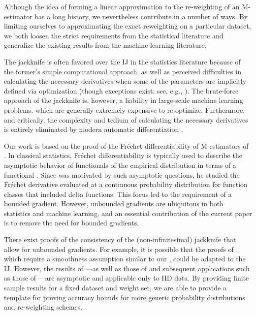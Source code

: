 Although the idea of forming a linear approximation to the re-weighting of an
M-estimator has a long history, we nevertheless contribute in a number of ways.
By limiting ourselves to approximating the exact reweighting on a particular
dataset, we both loosen the strict requirements from the statistical literature
and generalize the existing results from the machine learning literature.

The jackknife is often favored over the IJ in the
statistics literature because of the former's simple computational approach, as
well as perceived difficulties in calculating the necessary derivatives when
some of the parameters are implicitly defined via optimization
\citep[Chapter 2.1]{shao:2012:jackknife}
(though exceptions exist; see, e.g., \citet{wager:2014:confidence}).
The brute-force
approach of the jackknife is, however, a liability in large-scale machine
learning problems, which are generally extremely expensive to re-optimize.
Furthermore, and critically, the complexity and tedium of calculating the
necessary derivatives is entirely eliminated by modern automatic differentiation
\citep{baydin:2015:automatic, maclaurin:2015:autograd}.

Our work is based on the proof of the Fr{\'e}chet differentiability of
M-estimators of \citet{clarke:1983:uniqueness}. In classical statistics,
Fr{\'e}chet differentiability is typically used to describe the asymptotic
behavior of functionals of the empirical distribution in terms of a functional
\citep{mises:1947:asymptotic,fernholz:1983:mises}. Since
\citet{clarke:1983:uniqueness} was motivated by such asymptotic questions, he
studied the Fr{\'e}chet derivative evaluated at a continuous probability
distribution for function classes that included delta functions. This focus led
to the requirement of a bounded gradient.  However, unbounded gradients are
ubiquitous in both statistics and machine learning, and an essential
contribution of the current paper is to remove the need for bounded gradients.

There exist proofs of the consistency of the (non-infinitesimal) jackknife that
allow for unbounded gradients.  For example, it is possible that the proofs of
\citet{reeds:1978:jackknifing}, which require a smoothness assumption similar to
our , could be adapted to the IJ.
However, the results of \citet{reeds:1978:jackknifing}---as well as those of
\citet{clarke:1983:uniqueness} and subsequent applications such as those of
\citet{shao:2012:jackknife}---are asymptotic and applicable only to IID data. By
providing finite sample results for a fixed dataset and weight set, we are able
to provide a template for proving accuracy bounds for more generic probability
distributions and re-weighting schemes.

